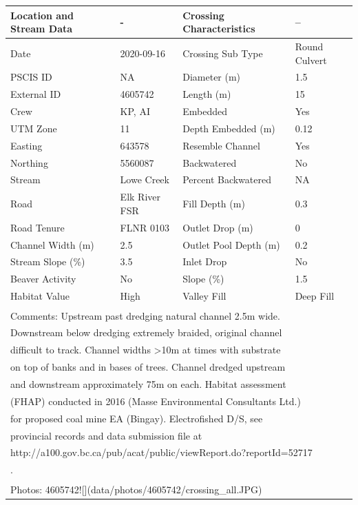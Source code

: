 \documentclass[
]{book}
\begin{document}
\begin{tabular}{l|l|l|l}
\hline
Location and Stream Data & - & Crossing Characteristics & --\\
\hline
Date & 2020-09-16 & Crossing Sub Type & Round Culvert\\
\hline
PSCIS ID & NA & Diameter (m) & 1.5\\
\hline
External ID & 4605742 & Length (m) & 15\\
\hline
Crew & KP, AI & Embedded & Yes\\
\hline
UTM Zone & 11 & Depth Embedded (m) & 0.12\\
\hline
Easting & 643578 & Resemble Channel & Yes\\
\hline
Northing & 5560087 & Backwatered & No\\
\hline
Stream & Lowe Creek & Percent Backwatered & NA\\
\hline
Road & Elk River FSR & Fill Depth (m) & 0.3\\
\hline
Road Tenure & FLNR 0103 & Outlet Drop (m) & 0\\
\hline
Channel Width (m) & 2.5 & Outlet Pool Depth (m) & 0.2\\
\hline
Stream Slope (\%) & 3.5 & Inlet Drop & No\\
\hline
Beaver Activity & No & Slope (\%) & 1.5\\
\hline
Habitat Value & High & Valley Fill & Deep Fill\\
\hline
\multicolumn{4}{l}{\textsuperscript{} Comments: Upstream past dredging natural channel 2.5m wide.}\\
\multicolumn{4}{l}{Downstream below dredging extremely braided, original channel}\\
\multicolumn{4}{l}{difficult to track. Channel widths >10m at times with substrate}\\
\multicolumn{4}{l}{on top of banks and in bases of trees. Channel dredged upstream}\\
\multicolumn{4}{l}{and downstream approximately 75m on each. Habitat assessment}\\
\multicolumn{4}{l}{(FHAP) conducted in 2016 (Masse Environmental Consultants Ltd.)}\\
\multicolumn{4}{l}{for proposed coal mine EA (Bingay). Electrofished D/S, see}\\
\multicolumn{4}{l}{provincial records and data submission file at}\\
\multicolumn{4}{l}{http://a100.gov.bc.ca/pub/acat/public/viewReport.do?reportId=52717}\\
\multicolumn{4}{l}{.}\\
\multicolumn{4}{l}{\textsuperscript{} Photos: 4605742![](data/photos/4605742/crossing\_all.JPG)}\\
\end{tabular}
\end{document}

